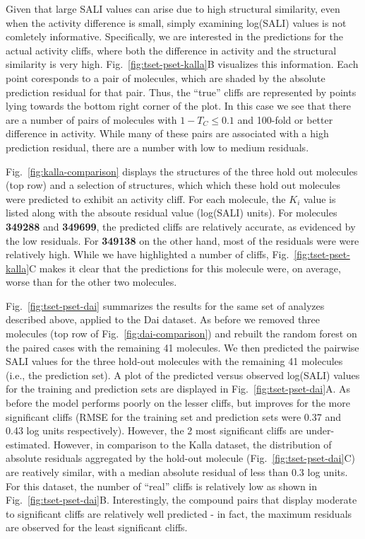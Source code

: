 \documentclass[letterpaper, 12pt]{article}
\begin{document}
Given that large SALI values can arise due to high structural
similarity, even when the activity difference is small, simply
examining log(SALI) values is not comletely informative. Specifically,
we are interested in the predictions for the actual activity cliffs,
where both the difference in activity and the structural similarity is
very high. Fig.~\ref{fig:tset-pset-kalla}B visualizes this
information. Each point coresponds to a pair of molecules, which are
shaded by the absolute prediction residual for that pair. Thus, the
``true'' cliffs are represented by points lying towards the bottom
right corner of the plot. In this case we see that there are a number
of pairs of molecules with $1 - T_C \leq 0.1$ and 100-fold or better
difference in activity. While many of these pairs are associated with
a high prediction residual, there are a number with low to medium
residuals.
  
Fig.~\ref{fig:kalla-comparison} displays the structures of the three
hold out molecules (top row) and a selection of structures, which
which these hold out molecules were predicted to exhibit an activity
cliff. For each molecule, the $K_i$ value is listed along with the
absoute residual value (log(SALI) units). For molecules
\textbf{349288} and \textbf{349699}, the predicted cliffs are
relatively accurate, as evidenced by the low residuals. For
\textbf{349138} on the other hand, most of the residuals were were
relatively high. While we have highlighted a number of cliffs,
Fig.~\ref{fig:tset-pset-kalla}C makes it clear that the predictions
for this molecule were, on average, worse than for the other two
molecules.

Fig.~\ref{fig:tset-pset-dai} summarizes the results for the same set
of analyzes described above, applied to the Dai dataset. As before we
removed three molecules (top row of Fig.~\ref{fig:dai-comparison}) and
rebuilt the random forest on the paired cases with the remaining 41
molecules. We then predicted the pairwise SALI values for the three
hold-out molecules with the remaining 41 molecules (i.e., the
prediction set). A plot of the predicted versus observed log(SALI)
values for the training and prediction sets are displayed in
Fig.~\ref{fig:tset-pset-dai}A. As before the model performs poorly on
the lesser cliffs, but improves for the more significant cliffs (RMSE
for the training set and prediction sets were 0.37 and 0.43 log units
respectively). However, the 2 most significant cliffs are
under-estimated. However, in comparison to the Kalla dataset, the
distribution of absolute residuals aggregated by the hold-out molecule
(Fig.~\ref{fig:tset-pset-dai}C) are reatively similar, with a median
absolute residual of less than 0.3 log units.  For this dataset, the
number of ``real'' cliffs is relatively low as shown in
Fig.~\ref{fig:tset-pset-dai}B. Interestingly, the compound pairs that
display moderate to significant cliffs are relatively well predicted -
in fact, the maximum residuals are observed for the least significant
cliffs.
\end{document}
